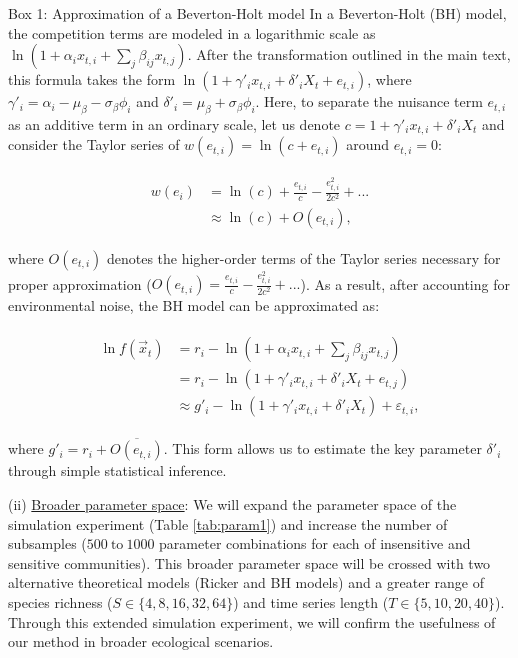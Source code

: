 \documentclass[12pt, class=article, crop=false]{standalone}
\begin{document}
\begin{tcolorbox}[{
  breakable,
  colback=white,
  colframe=gray,
  coltext=black,
  parbox=false,
  boxsep=5pt,
  arc=1pt}]
    Box 1: Approximation of a Beverton-Holt model
    \hline
    In a Beverton-Holt (BH) model, the competition terms are modeled in a logarithmic scale as $\ln(1 + \alpha_i x_{t,i} + \sum_j \beta_{ij} x_{t,j})$.
    After the transformation outlined in the main text, this formula takes the form $\ln(1 + \gamma'_i x_{t,i} + \delta'_i X_t + e_{t,i})$, where $\gamma'_i = \alpha_i - \mu_{\beta} - \sigma_{\beta} \phi_i$ and $\delta'_i = \mu_{\beta} + \sigma_{\beta} \phi_i$.
    Here, to separate the nuisance term $e_{t,i}$ as an additive term in an ordinary scale, let us denote $c = 1 + \gamma'_i x_{t,i} + \delta'_i X_t$ and consider the Taylor series of $w(e_{t,i}) = \ln(c + e_{t,i})$ around $e_{t,i} = 0$:

    \begin{align}
        \begin{split}
        \label{eq:bhtaylor}
        w(e_i) &= \ln(c) + \frac{e_{t,i}}{c} - \frac{e_{t,i}^2}{2 c^2} + ...\\
        &\approx \ln(c) + O(e_{t,i}),
        \end{split}
    \end{align}

    where $O(e_{t,i})$ denotes the higher-order terms of the Taylor series necessary for proper approximation ($O(e_{t,i}) = \frac{e_{t,i}}{c} - \frac{e_{t,i}^2}{2 c^2} + ...$). 
    As a result, after accounting for environmental noise, the BH model can be approximated as:

    \begin{align}
    \begin{split}
        \ln f(\overset{\rightarrow}{x}_{t}) 
            &= r_i - \ln(1 + \alpha_i x_{t,i} + \sum_j \beta_{ij} x_{t,j})\\
            &= r_i - \ln(1 + \gamma'_i x_{t,i} + \delta'_{i} X_t + e_{t,j})\\
            &\approx g'_{i} - \ln(1 + \gamma'_i x_{t,i} + \delta'_i X_t) + \varepsilon_{t,i},
    \end{split}
    \end{align}

    where $g'_{i} = r_i + \overline{O(e_{t,i})}$.
    This form allows us to estimate the key parameter $\delta'_i$ through simple statistical inference.
\end{tcolorbox}

(ii) \ul{Broader parameter space}: We will expand the parameter space of the simulation experiment (Table \ref{tab:param1}) and increase the number of subsamples ($500~\mbox{to}~1000$ parameter combinations for each of insensitive and sensitive communities).
This broader parameter space will be crossed with two alternative theoretical models (Ricker and BH models) and a greater range of species richness ($S \in \{4, 8, 16, 32, 64\}$) and time series length ($T \in \{5, 10, 20, 40\}$).
Through this extended simulation experiment, we will confirm the usefulness of our method in broader ecological scenarios.
\end{document}
